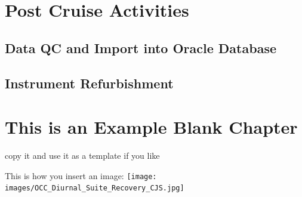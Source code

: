\documentclass[]{book}
\begin{document}
\hypertarget{postcruise}{%
\chapter{Post Cruise Activities}\label{postcruise}}

\hypertarget{data-qc-and-import-into-oracle-database}{%
\section{Data QC and Import into Oracle Database}\label{data-qc-and-import-into-oracle-database}}

\hypertarget{instrument-refurbishment}{%
\section{Instrument Refurbishment}\label{instrument-refurbishment}}

\hypertarget{this-is-an-example-blank-chapter}{%
\chapter{This is an Example Blank Chapter}\label{this-is-an-example-blank-chapter}}

copy it and use it as a template if you like

This is how you insert an image:
\texttt{[image: images/OCC\_Diurnal\_Suite\_Recovery\_CJS.jpg]}
\end{document}
